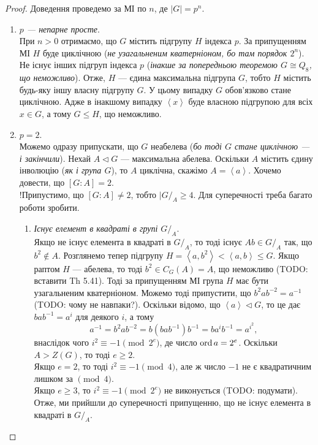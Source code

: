 \documentclass{math_library}
\begin{document}
\begin{proof}
Доведення проведемо за МІ по $n$, де $|G| = p^n$.
\begin{enumerate}[wide=0pt,label={\Roman*.}]
\item \textit{$p$ --- непарне просте}.\\
При $n > 0$ отримаємо, що $G$ містить підгрупу $H$ індекса $p$. За припущенням МІ $H$ буде циклічною (\textit{не узагальненим кватерніоном, бо там порядок $2^n$}). Не існує інших підгруп індекса $p$ (\textit{інакше за попередньою теоремою $G \cong Q_8$, що неможливо}). Отже, $H$ --- єдина максимальна підгрупа $G$, тобто $H$ містить будь-яку іншу власну підгрупу $G$. У цьому випадку $G$ обов'язково стане циклічною. Адже в інакшому випадку $\left<x\right>$ буде власною підгрупою для всіх $x \in G$, а тому $G \leq H$, що неможливо.

\item \textit{$p = 2$}.\\
Можемо одразу припускати, що $G$ неабелева (\textit{бо тоді $G$ стане циклічною --- і закінчили}). Нехай $A \triangleleft G$ --- максимальна абелева. Оскільки $A$ містить єдину інволюцію (\textit{як і група $G$}), то $A$ циклічна, скажімо $A = \left<a\right>$. Хочемо довести, що $[G:A] = 2$.\\
!Припустимо, що $[G:A] \neq 2$, тобто $|G/_A \geq 4$. Для суперечності треба багато роботи зробити.
\begin{enumerate}[wide=0pt,label={\roman*.}]
\item \textit{Існує елемент в квадраті в групі $G/_A$}.\\
Якщо не існує елемента в квадраті в $G/_A$, то тоді існує $Ab \in G/_A$ так, що $b^2 \notin A$. Розглянемо тепер підгрупу $H = \left<a,b^2\right> < \left<a,b\right> \leq G$. Якщо раптом $H$ --- абелева, то тоді $b^2 \in C_G(A) = A$, що неможливо (TODO: вставити Th 5.41). Тоді за припущенням МІ група $H$ має бути узагальненим кватерніоном. Можемо тоді припустити, що $b^2 a b^{-2} = a^{-1}$ (TODO: чому не навпаки?). Оскільки відомо, що $\left<a\right> \triangleleft G$, то це дає $bab^{-1} = a^{i}$ для деякого $i$, а тому
\[
a^{-1} = b^2 a b^{-2} = b(bab^{-1})b^{-1} = ba^{i}b^{-1} = a^{i^2},
\]
внаслідок чого $i^2 \equiv -1 \pmod {2^e}$, де число $\operatorname{ord} a = 2^e$. Оскільки $A > Z(G)$, то тоді $e \geq 2$.\\
Якщо $e = 2$, то тоді $i^2 \equiv -1 \pmod 4$, але ж число $-1$ не є квадратичним лишком за $\!\!\pmod 4$.\\
Якщо $e \geq 3$, то $i^2 \equiv -1 \pmod {2^e}$ не виконується (TODO: подумати).\\
Отже, ми прийшли до суперечності припущенню, що не існує елемента в квадраті в $G/_A$.


\end{enumerate}
\end{enumerate}
\end{proof}
\end{document}
